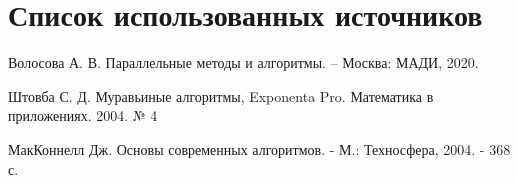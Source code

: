\chapter*{Список использованных источников}

\begin{enumerate}[label = {[\arabic*]}]
	 Волосова А. В. Параллельные методы и алгоритмы. -- Москва: МАДИ, 2020.

	 Штовба С. Д. Муравьиные алгоритмы, Exponenta Pro. Математика в приложениях. 2004. № 4
	
	 МакКоннелл Дж. Основы современных алгоритмов. - М.: Техносфера, 2004. - 368 с.
\end{enumerate}
